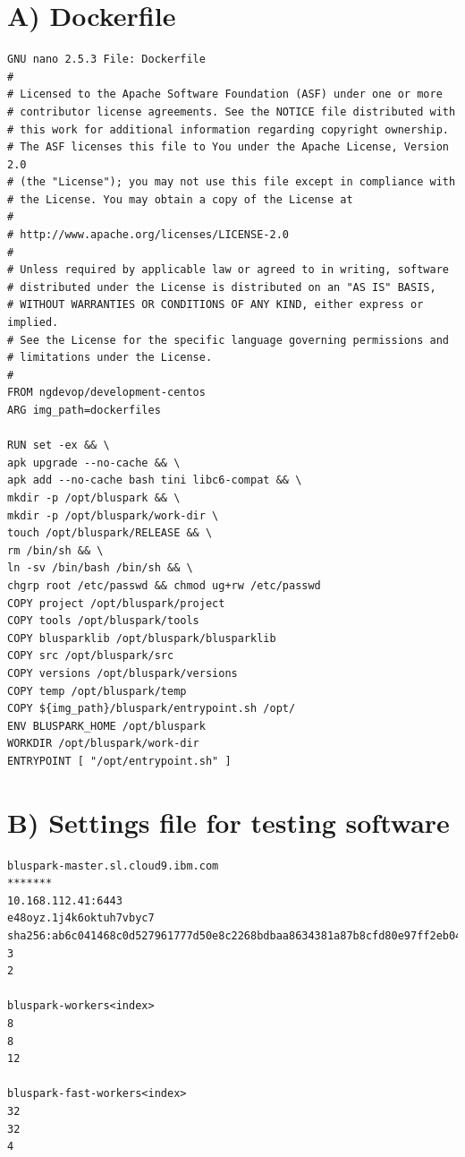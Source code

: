 
\appendix
{}


\chapter*{A) Dockerfile}
\begin{lstlisting}
GNU nano 2.5.3 File: Dockerfile
#
# Licensed to the Apache Software Foundation (ASF) under one or more
# contributor license agreements. See the NOTICE file distributed with
# this work for additional information regarding copyright ownership.
# The ASF licenses this file to You under the Apache License, Version 2.0
# (the "License"); you may not use this file except in compliance with
# the License. You may obtain a copy of the License at
#
# http://www.apache.org/licenses/LICENSE-2.0
#
# Unless required by applicable law or agreed to in writing, software
# distributed under the License is distributed on an "AS IS" BASIS,
# WITHOUT WARRANTIES OR CONDITIONS OF ANY KIND, either express or implied.
# See the License for the specific language governing permissions and
# limitations under the License.
#
FROM ngdevop/development-centos
ARG img_path=dockerfiles

RUN set -ex && \
apk upgrade --no-cache && \
apk add --no-cache bash tini libc6-compat && \
mkdir -p /opt/bluspark && \
mkdir -p /opt/bluspark/work-dir \
touch /opt/bluspark/RELEASE && \
rm /bin/sh && \
ln -sv /bin/bash /bin/sh && \
chgrp root /etc/passwd && chmod ug+rw /etc/passwd
COPY project /opt/bluspark/project
COPY tools /opt/bluspark/tools
COPY blusparklib /opt/bluspark/blusparklib
COPY src /opt/bluspark/src
COPY versions /opt/bluspark/versions
COPY temp /opt/bluspark/temp
COPY ${img_path}/bluspark/entrypoint.sh /opt/
ENV BLUSPARK_HOME /opt/bluspark
WORKDIR /opt/bluspark/work-dir
ENTRYPOINT [ "/opt/entrypoint.sh" ]
\end{lstlisting}

\chapter*{B) Settings file for testing software}
\begin{lstlisting}
bluspark-master.sl.cloud9.ibm.com
*******
10.168.112.41:6443
e48oyz.1j4k6oktuh7vbyc7
sha256:ab6c041468c0d527961777d50e8c2268bdbaa8634381a87b8cfd80e97ff2eb04
3
2

bluspark-workers<index>
8
8
12

bluspark-fast-workers<index>
32
32
4
\end{lstlisting}

